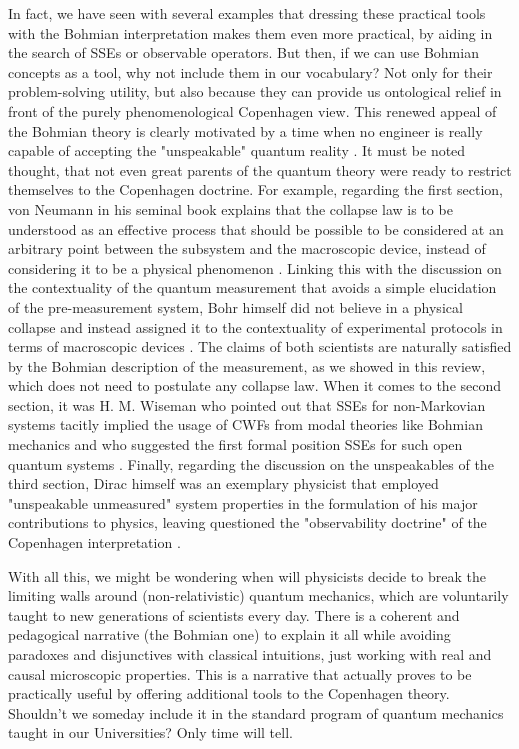 \documentclass[11pt, a4paper]{article} %
\begin{document}
In fact, we have seen with several examples that dressing these practical tools with the Bohmian interpretation makes them even more practical, by aiding in the search of SSEs or observable operators. But then, if we can use Bohmian concepts as a tool, why not include them in our vocabulary? Not only for their problem-solving utility, but also because they can provide us ontological relief in front of the purely phenomenological Copenhagen view. This renewed appeal of the Bohmian theory is clearly motivated by a time when no engineer is really capable of accepting the "unspeakable" quantum reality \cite{where, consp}. It must be noted thought, that not even great parents of the quantum theory were ready to restrict themselves to the Copenhagen doctrine. For example, regarding the first section, von Neumann in his seminal book \cite{vonNeumann} explains that the collapse law is to be understood as an effective process that should be possible to be considered at an arbitrary point between the subsystem and the macroscopic device, instead of considering it to be a physical phenomenon \cite{NeumannNoCollapse}. Linking this with the discussion on the contextuality of the quantum measurement that avoids a simple elucidation of the pre-measurement system, Bohr himself did not believe in a physical collapse and instead assigned it to the contextuality of experimental protocols \cite{Dirac} in terms of macroscopic devices \cite{Bohr}. The claims of both scientists are naturally satisfied by the Bohmian description of the measurement, as we showed in this review, which does not need to postulate any collapse law. When it comes to the second section, it was H. M. Wiseman who pointed out that SSEs for non-Markovian systems tacitly implied the usage of CWFs from modal theories like Bohmian mechanics \cite{interpretSSE, NMisModal} and who suggested the first formal position SSEs for such open quantum systems \cite{WisemanSSE}. Finally, regarding the discussion on the unspeakables of the third section, Dirac himself was an exemplary physicist that employed "unspeakable unmeasured" system properties in the formulation of his major contributions to physics, leaving questioned the "observability doctrine" of the Copenhagen interpretation \cite{Dirac}.

With all this, we might be wondering when will physicists decide to break the limiting walls around (non-relativistic) quantum mechanics, which are voluntarily taught to new generations of scientists every day. There is a coherent and pedagogical narrative (the Bohmian one) to explain it all while avoiding paradoxes and disjunctives with classical intuitions, just working with real and causal microscopic properties. This is a narrative that actually proves to be practically useful by offering additional tools to the Copenhagen theory. Shouldn't we someday include it in the standard program of quantum mechanics taught in our Universities? Only time will tell.


{\small



}
\end{document}
